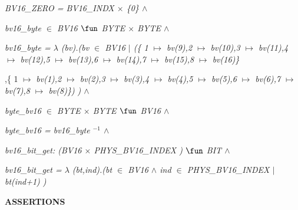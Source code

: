 \hspace*{0.20in}\it BV16\_ZERO \rm = \it BV16\_INDX $\times$ \rm \{\rm 0\rm \}  $\land$ 

\hspace*{0.20in}

\hspace*{0.20in}\it bv16\_byte $\in$  \it BV16  $\fun$  \it BYTE  $\times$  \it BYTE  $\land$ 

\hspace*{0.20in}\it bv16\_byte \rm =  $\lambda$ \rm (\it bv\rm )\rm .\rm (\it bv $\in$ \it BV16  $\mid$  \rm (\rm \{ \rm 1 $\mapsto$ \it bv\rm (\rm 9\rm )\rm ,\rm 2 $\mapsto$ \it bv\rm (\rm 1\rm 0\rm )\rm ,\rm 3 $\mapsto$ \it bv\rm (\rm 1\rm 1\rm )\rm ,\rm 4 $\mapsto$ \it bv\rm (\rm 1\rm 2\rm )\rm ,\rm 5 $\mapsto$ \it bv\rm (\rm 1\rm 3\rm )\rm ,\rm 6 $\mapsto$ \it bv\rm (\rm 1\rm 4\rm )\rm ,\rm 7 $\mapsto$ \it bv\rm (\rm 1\rm 5\rm )\rm ,\rm 8 $\mapsto$ \it bv\rm (\rm 1\rm 6\rm )\rm \}

\hspace*{1.60in}\rm ,\rm \{ \rm 1 $\mapsto$ \it bv\rm (\rm 1\rm )\rm ,\rm 2 $\mapsto$ \it bv\rm (\rm 2\rm )\rm ,\rm 3 $\mapsto$ \it bv\rm (\rm 3\rm )\rm ,\rm 4 $\mapsto$ \it bv\rm (\rm 4\rm )\rm ,\rm 5 $\mapsto$ \it bv\rm (\rm 5\rm )\rm ,\rm 6 $\mapsto$ \it bv\rm (\rm 6\rm )\rm ,\rm 7 $\mapsto$ \it bv\rm (\rm 7\rm )\rm ,\rm 8 $\mapsto$ \it bv\rm (\rm 8\rm )\rm \}\rm ) \rm )  $\land$ 

\hspace*{0.20in}\it byte\_bv16  $\in$ \hspace*{0.10in}\it BYTE  $\times$  \it BYTE  $\fun$  \it BV16  $\land$ \hspace*{0.80in}

\hspace*{0.25in}\it byte\_bv16 \rm = \it bv16\_byte $^{-1}$   $\land$ 

\vspace*{4mm}
\hspace*{0.20in}\it bv16\_bit\_get\rm : \rm (\it BV16  $\times$  \it PHYS\_BV16\_INDEX \rm ) $\fun$  \it BIT  $\land$ 

\hspace*{0.20in}\it bv16\_bit\_get \rm =  $\lambda$ \rm (\it bt\rm ,\it ind\rm )\rm .\rm (\it bt $\in$ \it BV16  $\land$  \it ind $\in$ \it PHYS\_BV16\_INDEX  $\mid$  \it bt\rm (\it ind\rm +\rm 1\rm ) \rm )\hspace*{0.20in}

\vspace*{4mm}
\bf ASSERTIONS


